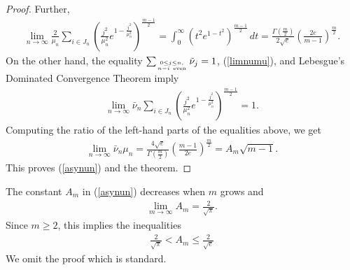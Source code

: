 \documentclass[10pt]{amsart}
\theoremstyle{remark}
\let\td=\tilde
\begin{document}
\begin{proof}
Further,
\begin{eqnarray*}
\lim_{n\to\infty}\frac{2}{\mu_n}\sum_{i\in J_n}
\left(\frac{j^2}{\mu_n^2}
e^{1-\frac{j^2}{\mu_n^2}}\right)^{\frac{m-1}{2}} =\int_0^\infty
\left(t^2e^{1-t^2}\right)^{\frac{m-1}{2}}\,dt
=\frac{{{\mathord{\Gamma}}}\left(\frac{m}{2}\right)}{2\sqrt{e}}
\left(\frac{2e}{m-1}\right)^{\frac{m}{2}}.
\end{eqnarray*}
On the other hand, the equality $\sum_{0\leq j\leq n,\atop
n-i~\mbox{\rm\tiny even}}\td\nu_j=1$, (\ref{limnumu}), and
Lebesgue's Dominated Convergence Theorem imply
\begin{eqnarray*}
\lim_{n\to\infty}\bar\nu_n\sum_{i\in J_n}\left(\frac{j^2}{\mu_n^2}
e^{1-\frac{j^2}{\mu_n^2}}\right)^{\frac{m-1}{2}}=1.
\end{eqnarray*}
Computing the ratio of the left-hand parts of the equalities
above, we get
\begin{eqnarray} \label{limnumun}
\lim_{n\to\infty}\bar\nu_n\mu_n=
\frac{4\sqrt{e}}{{{\mathord{\Gamma}}}\left(\frac{m}{2}\right)}
\left(\frac{m-1}{2e}\right)^{\frac{m}{2}}=A_m\sqrt{m-1}.
\end{eqnarray}
This proves (\ref{asynun}) and the theorem.
\end{proof}
The constant $A_m$ in (\ref{asynun}) decreases when $m$ grows and
\begin{eqnarray*}
\lim_{m\to\infty}A_m=\frac{2}{\sqrt{\pi}}.
\end{eqnarray*}
Since $m\geq2$, this implies the inequalities
\begin{eqnarray}\label{ineqam}
\frac{2}{\sqrt{\pi}}<A_m\leq\frac{2}{\sqrt{e}}
\end{eqnarray}
We omit the proof which is standard.
\end{document}
